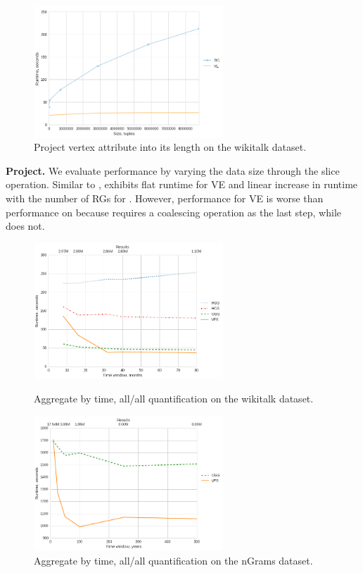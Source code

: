\begin{figure}
\centering
\includegraphics[width=2.8in]{figs/project_wikitalk_vertices_build12.png}
\caption{Project vertex attribute into its length on the wikitalk dataset.}
\label{fig:project}
\end{figure}

{\bf Project.}  We evaluate  performance by varying the
data size through the slice operation.  Similar to ,
 exhibits flat runtime for VE and linear increase in
runtime with the number of RGs for \sg.  However, performance for VE
is worse than performance on  because 
requires a coalescing operation as the last step, while 
does not.

\begin{figure}
\centering
\begin{minipage}{3.3in}
\centering
\includegraphics[width=2.8in]{figs/agg_allall_wikitalk_vertices_build11.png}
\caption{Aggregate by time, all/all quantification on the wikitalk dataset.}
\label{fig:agg1}
\end{minipage}
\begin{minipage}{3.3in}
\centering
\includegraphics[width=2.8in]{figs/agg_allall_ngrams_edges_build11.png}
\caption{Aggregate by time, all/all quantification on the nGrams dataset.}
\label{fig:agg2}
\end{minipage}
\end{figure}

